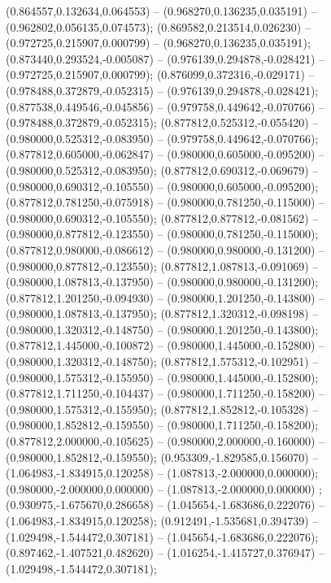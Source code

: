  (0.864557,0.132634,0.064553) -- (0.968270,0.136235,0.035191) -- (0.962802,0.056135,0.074573);
 (0.869582,0.213514,0.026230) -- (0.972725,0.215907,0.000799) -- (0.968270,0.136235,0.035191);
 (0.873440,0.293524,-0.005087) -- (0.976139,0.294878,-0.028421) -- (0.972725,0.215907,0.000799);
 (0.876099,0.372316,-0.029171) -- (0.978488,0.372879,-0.052315) -- (0.976139,0.294878,-0.028421);
 (0.877538,0.449546,-0.045856) -- (0.979758,0.449642,-0.070766) -- (0.978488,0.372879,-0.052315);
 (0.877812,0.525312,-0.055420) -- (0.980000,0.525312,-0.083950) -- (0.979758,0.449642,-0.070766);
 (0.877812,0.605000,-0.062847) -- (0.980000,0.605000,-0.095200) -- (0.980000,0.525312,-0.083950);
 (0.877812,0.690312,-0.069679) -- (0.980000,0.690312,-0.105550) -- (0.980000,0.605000,-0.095200);
 (0.877812,0.781250,-0.075918) -- (0.980000,0.781250,-0.115000) -- (0.980000,0.690312,-0.105550);
 (0.877812,0.877812,-0.081562) -- (0.980000,0.877812,-0.123550) -- (0.980000,0.781250,-0.115000);
 (0.877812,0.980000,-0.086612) -- (0.980000,0.980000,-0.131200) -- (0.980000,0.877812,-0.123550);
 (0.877812,1.087813,-0.091069) -- (0.980000,1.087813,-0.137950) -- (0.980000,0.980000,-0.131200);
 (0.877812,1.201250,-0.094930) -- (0.980000,1.201250,-0.143800) -- (0.980000,1.087813,-0.137950);
 (0.877812,1.320312,-0.098198) -- (0.980000,1.320312,-0.148750) -- (0.980000,1.201250,-0.143800);
 (0.877812,1.445000,-0.100872) -- (0.980000,1.445000,-0.152800) -- (0.980000,1.320312,-0.148750);
 (0.877812,1.575312,-0.102951) -- (0.980000,1.575312,-0.155950) -- (0.980000,1.445000,-0.152800);
 (0.877812,1.711250,-0.104437) -- (0.980000,1.711250,-0.158200) -- (0.980000,1.575312,-0.155950);
 (0.877812,1.852812,-0.105328) -- (0.980000,1.852812,-0.159550) -- (0.980000,1.711250,-0.158200);
 (0.877812,2.000000,-0.105625) -- (0.980000,2.000000,-0.160000) -- (0.980000,1.852812,-0.159550);
 (0.953309,-1.829585,0.156070) -- (1.064983,-1.834915,0.120258) -- (1.087813,-2.000000,0.000000);
 (0.980000,-2.000000,0.000000) -- (1.087813,-2.000000,0.000000) ;
 (0.930975,-1.675670,0.286658) -- (1.045654,-1.683686,0.222076) -- (1.064983,-1.834915,0.120258);
 (0.912491,-1.535681,0.394739) -- (1.029498,-1.544472,0.307181) -- (1.045654,-1.683686,0.222076);
 (0.897462,-1.407521,0.482620) -- (1.016254,-1.415727,0.376947) -- (1.029498,-1.544472,0.307181);

